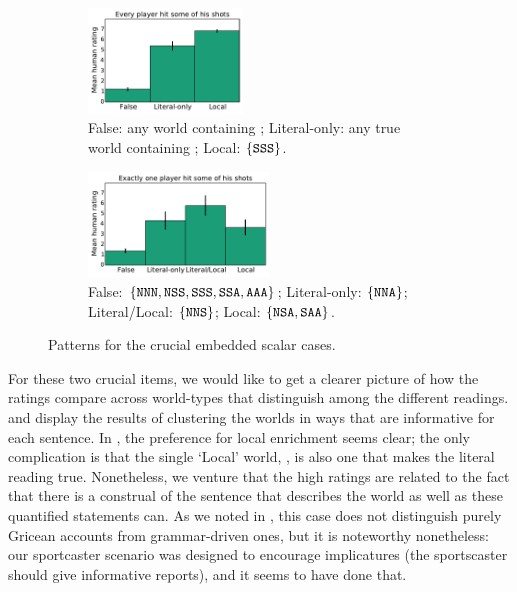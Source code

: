 \documentclass[leqno]{article}
\begin{document}
\begin{figure}[t]
  \centering
  \begin{subfigure}{0.47\textwidth}  
    \centering
    \includegraphics[height=2.8cm]{fig/every-some}
    \caption{False: any world containing ; 
      Literal-only: any true world containing ; 
      Local: $\left\{ \texttt{SSS} \right\}$.}
    \label{fig:crucial-every}
  \end{subfigure}
  \hfill
  \begin{subfigure}{0.47\textwidth}
    \centering
    \includegraphics[height=2.8cm]{fig/exactlyone-some}    
    \caption{False: $\left\{ \texttt{NNN}, \texttt{NSS}, \texttt{SSS}, \texttt{SSA}, \texttt{AAA} \right\}$;
      Literal-only: $\left\{ \texttt{NNA} \right\}$;
      Literal/Local: $\left\{ \texttt{NNS} \right\}$;
      Local: $\left\{ \texttt{NSA}, \texttt{SAA} \right\}$.}
    \label{fig:crucial-exactlyone}
    \end{subfigure}
    \caption{Patterns for the crucial embedded scalar cases.}
    \label{fig:crucial}
\end{figure}


For these two crucial items, we would like to get a clearer picture of
how the ratings compare across world-types that distinguish among the
different readings.  and
 display the results of clustering the
worlds in ways that are informative for each sentence. In
, the preference for local enrichment seems
clear; the only complication is that the single `Local' world,
, is also one that makes the literal reading
true. Nonetheless, we venture that the high ratings are related to the
fact that there is a construal of the sentence that describes the
world as well as these quantified statements can. As we noted in
, this case does not distinguish purely
Gricean accounts from grammar-driven ones, but it is noteworthy
nonetheless: our sportcaster scenario was designed to encourage
implicatures (the sportscaster should give informative reports), and it
seems to have done that.
\end{document}
